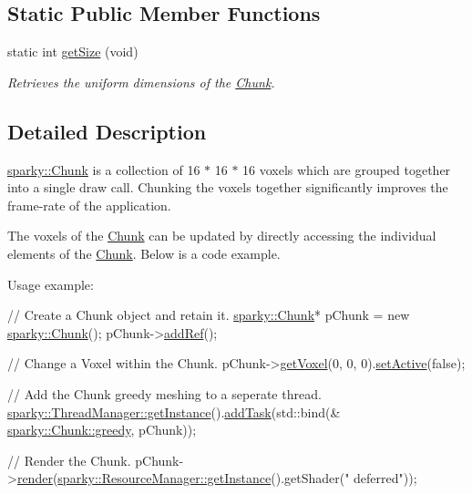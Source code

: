 \subsection*{Static Public Member Functions}
\begin{DoxyCompactItemize}
\item 
static int \hyperlink{classsparky_1_1_chunk_a98fd1c296d3373756675e9a17dcdd622}{get\+Size} (void)
\begin{DoxyCompactList}\small\item\em Retrieves the uniform dimensions of the \hyperlink{classsparky_1_1_chunk}{Chunk}. \end{DoxyCompactList}\end{DoxyCompactItemize}


\subsection{Detailed Description}
\hyperlink{classsparky_1_1_chunk}{sparky\+::\+Chunk} is a collection of 16 $\ast$ 16 $\ast$ 16 voxels which are grouped together into a single draw call. Chunking the voxels together significantly improves the frame-\/rate of the application.

The voxels of the \hyperlink{classsparky_1_1_chunk}{Chunk} can be updated by directly accessing the individual elements of the \hyperlink{classsparky_1_1_chunk}{Chunk}. Below is a code example.

Usage example\+: 
\begin{DoxyCode}
\textcolor{comment}{// Create a Chunk object and retain it.}
\hyperlink{classsparky_1_1_chunk}{sparky::Chunk}* pChunk = \textcolor{keyword}{new} \hyperlink{classsparky_1_1_chunk}{sparky::Chunk}();
pChunk->\hyperlink{classsparky_1_1_ref_aeeb606836c315aa3b8a2254e23eb0899}{addRef}();

\textcolor{comment}{// Change a Voxel within the Chunk.}
pChunk->\hyperlink{classsparky_1_1_chunk_adc8906c4ddc933c7e27fc273f6ec6e4d}{getVoxel}(0, 0, 0).\hyperlink{classsparky_1_1_voxel_a358a07e19e2b9a5ad0f61b45b5c3cf12}{setActive}(\textcolor{keyword}{false});

\textcolor{comment}{// Add the Chunk greedy meshing to a seperate thread.}
\hyperlink{classsparky_1_1_singleton_a8e56848cf24e5f4cdcd493c64d576f10}{sparky::ThreadManager::getInstance}().\hyperlink{classsparky_1_1_thread_manager_ade9dc04071ece6e4aec12b5479dfbd53}{addTask}(std::bind(&
      \hyperlink{classsparky_1_1_chunk_a007d463c5ec8c516cc10a6aed31f028e}{sparky::Chunk::greedy}, pChunk));

\textcolor{comment}{// Render the Chunk.}
pChunk->\hyperlink{classsparky_1_1_chunk_a24afefc8aa1fe69218a4e25ce9c06dc2}{render}(\hyperlink{classsparky_1_1_singleton_a8e56848cf24e5f4cdcd493c64d576f10}{sparky::ResourceManager::getInstance}().getShader(\textcolor{stringliteral}{"
      deferred"}));
\end{DoxyCode}
 

